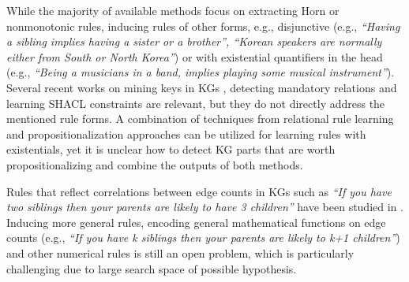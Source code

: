 While the majority of available methods focus on extracting Horn or nonmonotonic rules, inducing rules of other forms, e.g., %
disjunctive 
(e.g., \emph{``Having a sibling implies having a sister or a brother'', ``Korean speakers are normally either from South or North Korea''})
 or with existential quantifiers in the head (e.g., \emph{``Being a musicians in a band, implies  playing some musical instrument''}).
Several recent works on mining keys in KGs \cite{vickey,DBLP:conf/www/LajusS18}, detecting mandatory relations \cite{DBLP:conf/www/LajusS18} and learning SHACL constraints \cite{shacl} are relevant, but they do not directly address the mentioned rule forms. A combination of techniques from relational rule learning \cite{DBLP:books/daglib/0021868} and propositionalization approaches \cite{propos} can be utilized for learning rules with existentials, yet it is unclear how to detect KG parts that are worth propositionalizing and combine the outputs of both methods.  %

Rules that reflect correlations between edge counts in KGs such as \emph{``If you have two siblings then your parents are likely to have 3 children''} have been studied in \cite{carl}. Inducing more general rules, encoding general mathematical functions on edge counts (e.g.,  \emph{``If you have k siblings then your parents are likely to k+1 children''}) and other numerical rules is still an open problem, which is particularly challenging due to large search space of possible hypothesis.

